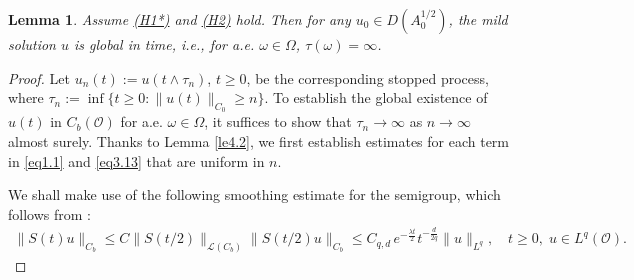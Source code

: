 \documentclass[10pt]{article}
\numberwithin{figure}{section}
\numberwithin{equation}{section}
\newtheorem{lemma}[theorem]{Lemma}
\newcommand{\cL}{{\mathcal L}}
\newcommand{\0}{{\theta}}
\def\bl{\begin{lemma}}
\def\el{\end{lemma}}
\def\lam{\lambda}
\def\w{\omega}
\def\a{\alpha}
\def\W{\Omega}
\def\8{\infty}
\begin{document}
\vs


\bl Assume \hyperref[H1*]{(H1*)} and \hyperref[H2]{(H2)} hold. Then for any $u_0 \in D(A_0^{1/2})$, the mild solution $u$ is global in time, i.e., for a.e. $\w\in\W$, $\tau(\w)=\8$. \el
 \begin{proof}Let $u_n(t) := u(t \wedge \tau_n)$, $t \ge 0$, be the corresponding stopped process, where $\tau_n := \inf\{t \ge 0 : \|u(t)\|_{C_0} \ge n\}$. To establish the global existence of $u(t)$ in $C_b(\mathcal{O})$ for a.e. $\omega\in\W$, it suffices to show that $\tau_n \to \infty$ as $n \to \infty$ almost surely. 
\vs
Thanks to Lemma \ref{le4.2}, we first establish estimates for each term in \eqref{eq1.1} and \eqref{eq3.13} that are uniform in $n$. 

We shall make use of the following smoothing estimate for the semigroup, which follows from \cite[Proposition 48.4* (e)]{QS}:
\begin{equation}\label{eq3.4}
\begin{split}
\|S(t) u \|_{C_b}
\le C \|S(t/2)\|_{\cL(C_b)}\|S(t/2) u \|_{C_b}\le C_{q,d}\, e^{-\frac{\lam t}{2}} t^{-\frac{d}{2q}} \| u \|_{L^q}, \quad t\ge0,\; u \in L^q(\mathcal{O}).
\end{split}
\end{equation}


\end{proof}
\end{document}
